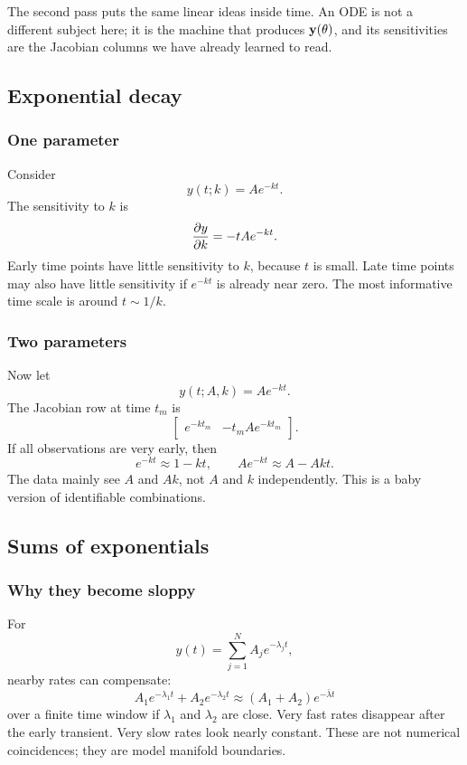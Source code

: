 \noindent
The second pass puts the same linear ideas inside time.  An ODE is not a different subject here; it is the machine that produces \(\mathbf{y}(\theta)\), and its sensitivities are the Jacobian columns we have already learned to read.

\subsection{Exponential decay}

\subsubsection*{One parameter}

Consider
\[
  y(t;k)=A e^{-kt}.
\]
The sensitivity to \(k\) is
\[
  \frac{\partial y}{\partial k}
  =
  -tA e^{-kt}.
\]
Early time points have little sensitivity to \(k\), because \(t\) is small.  Late time points may also have little sensitivity if \(e^{-kt}\) is already near zero.  The most informative time scale is around \(t\sim 1/k\).

\subsubsection*{Two parameters}

Now let
\[
  y(t;A,k)=A e^{-kt}.
\]
The Jacobian row at time \(t_m\) is
\[
  \begin{bmatrix}
    e^{-kt_m} & -t_m A e^{-kt_m}
  \end{bmatrix}.
\]
If all observations are very early, then
\[
  e^{-kt}\approx 1-kt,
  \qquad
  A e^{-kt}\approx A-Akt.
\]
The data mainly see \(A\) and \(Ak\), not \(A\) and \(k\) independently.  This is a baby version of identifiable combinations.

\subsection{Sums of exponentials}

\subsubsection*{Why they become sloppy}

For
\[
  y(t)=\sum_{j=1}^N A_j e^{-\lambda_j t},
\]
nearby rates can compensate:
\[
  A_1e^{-\lambda_1 t}+A_2e^{-\lambda_2 t}
  \approx
  (A_1+A_2)e^{-\bar{\lambda}t}
\]
over a finite time window if \(\lambda_1\) and \(\lambda_2\) are close.  Very fast rates disappear after the early transient.  Very slow rates look nearly constant.  These are not numerical coincidences; they are model manifold boundaries.

